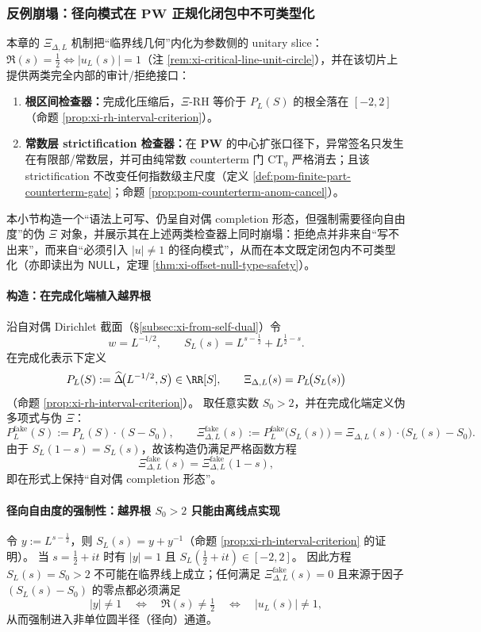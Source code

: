 \subsubsection{反例崩塌：径向模式在 \texorpdfstring{$\mathbf{PW}$}{PW} 正规化闭包中不可类型化}\label{subsec:xi-radial-counterexample-collapse}
本章的 \(\Xi_{\Delta,L}\) 机制把“临界线几何”内化为参数侧的 unitary slice：\(\Re(s)=\tfrac12\Longleftrightarrow |u_L(s)|=1\)（注 \ref{rem:xi-critical-line-unit-circle}），并在该切片上提供两类完全内部的审计/拒绝接口：
\begin{enumerate}
  \item \textbf{根区间检查器：}完成化压缩后，\(\Xi\)-RH 等价于 \(P_L(S)\) 的根全落在 \([-2,2]\)（命题 \ref{prop:xi-rh-interval-criterion}）。
  \item \textbf{常数层 strictification 检查器：}在 \(\mathbf{PW}\) 的中心扩张口径下，异常签名只发生在有限部/常数层，并可由纯常数 counterterm 门 \(\mathrm{CT}_\eta\) 严格消去；且该 strictification 不改变任何指数级主尺度（定义 \ref{def:pom-finite-part-counterterm-gate}；命题 \ref{prop:pom-counterterm-anom-cancel}）。
\end{enumerate}
本小节构造一个“语法上可写、仍呈自对偶 completion 形态，但强制需要径向自由度”的伪 \(\Xi\) 对象，并展示其在上述两类检查器上同时崩塌：拒绝点并非来自“写不出来”，而来自“必须引入 \(|u|\neq 1\) 的径向模式”，从而在本文既定闭包内不可类型化（亦即读出为 \(\mathsf{NULL}\)，定理 \ref{thm:xi-offset-null-type-safety}）。

\paragraph{构造：在完成化端植入越界根}
沿自对偶 Dirichlet 截面（\S\ref{subsec:xi-from-self-dual}）令
\[
w=L^{-1/2},\qquad S_L(s)=L^{s-\tfrac12}+L^{\tfrac12-s}.
\]
在完成化表示下定义
\[
P_L(S):=\widehat\Delta\!\bigl(L^{-1/2},S\bigr)\in\RR[S],
\qquad
\Xi_{\Delta,L}(s)=P_L\!\bigl(S_L(s)\bigr)
\]
（命题 \ref{prop:xi-rh-interval-criterion}）。
取任意实数 \(S_0>2\)，并在完成化端定义伪多项式与伪 \(\Xi\)：
\[
P^{\mathrm{fake}}_L(S):=P_L(S)\cdot (S-S_0),
\qquad
\Xi^{\mathrm{fake}}_{\Delta,L}(s):=P^{\mathrm{fake}}_L\!\bigl(S_L(s)\bigr)
=\Xi_{\Delta,L}(s)\cdot\bigl(S_L(s)-S_0\bigr).
\]
由于 \(S_L(1-s)=S_L(s)\)，故该构造仍满足严格函数方程
\[
\Xi^{\mathrm{fake}}_{\Delta,L}(s)=\Xi^{\mathrm{fake}}_{\Delta,L}(1-s),
\]
即在形式上保持“自对偶 completion 形态”。

\paragraph{径向自由度的强制性：越界根 \texorpdfstring{$S_0>2$}{S0>2} 只能由离线点实现}
令 \(y:=L^{s-\tfrac12}\)，则 \(S_L(s)=y+y^{-1}\)（命题 \ref{prop:xi-rh-interval-criterion} 的证明）。
当 \(s=\tfrac12+it\) 时有 \(|y|=1\) 且 \(S_L(\tfrac12+it)\in[-2,2]\)。
因此方程
\(
S_L(s)=S_0>2
\)
不可能在临界线上成立；任何满足 \(\Xi^{\mathrm{fake}}_{\Delta,L}(s)=0\) 且来源于因子 \((S_L(s)-S_0)\) 的零点都必须满足
\[
|y|\neq 1
\quad\Longleftrightarrow\quad
\Re(s)\neq\tfrac12
\quad\Longleftrightarrow\quad
|u_L(s)|\neq 1,
\]
从而强制进入非单位圆半径（径向）通道。

